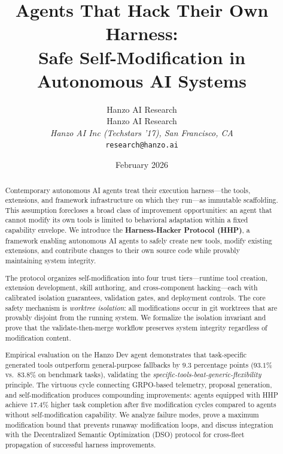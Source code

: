 \documentclass[11pt]{article}
\title{Agents That Hack Their Own Harness:\\Safe Self-Modification in Autonomous AI Systems}
\author{
    Hanzo AI Research \\
    Hanzo AI Research\\
    \textit{Hanzo AI Inc (Techstars '17), San Francisco, CA}\\
    \texttt{research@hanzo.ai}
}
\date{February 2026}
\begin{document}
\hanzocoverpage

\begin{abstract}
Contemporary autonomous AI agents treat their execution harness---the tools,
extensions, and framework infrastructure on which they run---as immutable
scaffolding. This assumption forecloses a broad class of improvement
opportunities: an agent that cannot modify its own tools is limited to
behavioral adaptation within a fixed capability envelope. We introduce the
\textbf{Harness-Hacker Protocol (HHP)}, a framework enabling autonomous AI
agents to safely create new tools, modify existing extensions, and contribute
changes to their own source code while provably maintaining system integrity.

The protocol organizes self-modification into four trust tiers---runtime tool
creation, extension development, skill authoring, and cross-component
hacking---each with calibrated isolation guarantees, validation gates, and
deployment controls. The core safety mechanism is \emph{worktree isolation}: all
modifications occur in git worktrees that are provably disjoint from the running
system. We formalize the isolation invariant and prove that the
validate-then-merge workflow preserves system integrity regardless of
modification content.

Empirical evaluation on the Hanzo Dev agent demonstrates that task-specific
generated tools outperform general-purpose fallbacks by $\mathbf{9.3}$
percentage points ($93.1\%$ vs.\ $83.8\%$ on benchmark tasks), validating the
\emph{specific-tools-beat-generic-flexibility} principle. The virtuous cycle
connecting GRPO-based telemetry, proposal generation, and self-modification
produces compounding improvements: agents equipped with HHP achieve $\mathbf{17.4\%}$
higher task completion after five modification cycles compared to agents without
self-modification capability. We analyze failure modes, prove a maximum
modification bound that prevents runaway modification loops, and discuss
integration with the Decentralized Semantic Optimization (DSO) protocol for
cross-fleet propagation of successful harness improvements.
\end{abstract}

\end{document}
